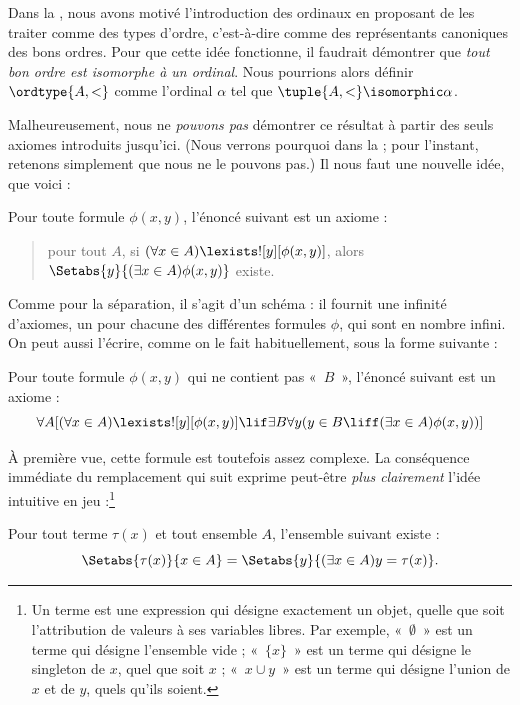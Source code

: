 \documentclass[../../../include/open-logic-section]{subfiles}
\begin{document}

Dans la , nous avons motivé l'introduction
des ordinaux en proposant de les traiter comme des types d'ordre,
c'est-à-dire comme des représentants canoniques des bons ordres. Pour
que cette idée fonctionne, il faudrait démontrer que \emph{tout bon
ordre est isomorphe à un ordinal}. Nous pourrions alors définir
$\ordtype{A, <}$ comme l'ordinal $\alpha$ tel que
$\tuple{A, <} \isomorphic \alpha$.

Malheureusement, nous ne \emph{pouvons pas} démontrer ce résultat à
partir des seuls axiomes introduits jusqu'ici. (Nous verrons pourquoi
dans la  ; pour l'instant, retenons
simplement que nous ne le pouvons pas.) Il nous faut une nouvelle
idée, que voici :

\begin{axiom}
Pour toute formule $\phi(x, y)$, l'énoncé suivant est un axiome :
\begin{quote}
	pour tout $A$, si $(\forall x \in A)\lexists![y][\phi(x,y)]$,
	alors $\Setabs{y}{(\exists x \in A)\phi(x,y)}$ existe.
\end{quote}
\end{axiom}
\noindent
Comme pour la séparation, il s'agit d'un schéma : il fournit une
infinité d'axiomes, un pour chacune des différentes formules
$\phi$, qui sont en nombre infini. On peut aussi l'écrire, comme on
le fait habituellement, sous la forme suivante :

\begin{defish}
Pour toute formule $\phi(x,y)$ qui ne contient pas «~$B$~»,
l'énoncé suivant est un axiome :
\[
\forall A[(\forall x \in A)\lexists![y][\phi(x,y)] \lif \exists B\forall y (y \in B \liff (\exists x \in A)\phi(x,y))]
\]
\end{defish}

À première vue, cette formule est toutefois assez complexe. La
conséquence immédiate du remplacement qui suit exprime peut-être
\emph{plus clairement} l'idée intuitive en jeu :\footnote{Un terme
est une expression qui désigne exactement un objet, quelle que soit
l'attribution de valeurs à ses variables libres. Par exemple,
«~$\emptyset$~» est un terme qui désigne l'ensemble vide ;
«~$\{x\}$~» est un terme qui désigne le singleton de $x$, quel que
soit $x$ ; «~$x \cup y$~» est un terme qui désigne l'union de $x$ et de
$y$, quels qu'ils soient.}

\begin{cor}
Pour tout terme $\tau(x)$ et tout ensemble $A$, l'ensemble suivant
existe :
\[
	\Setabs{\tau(x)}{x \in A} = \Setabs{y}{(\exists x \in A)y = \tau(x)}.
\]
\end{cor}
\end{document}
